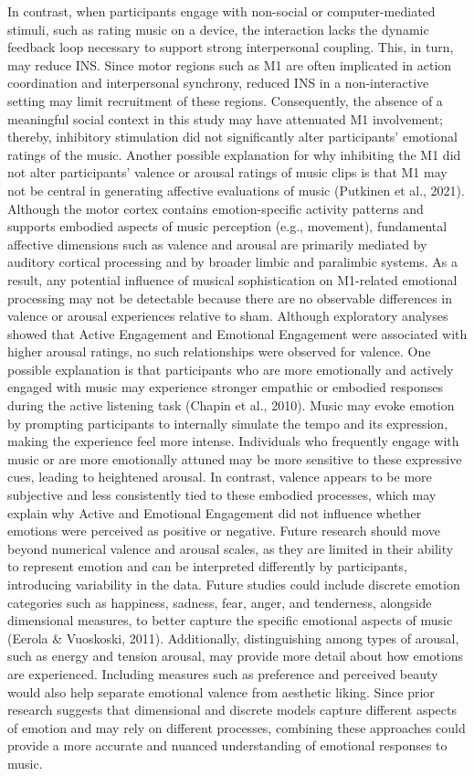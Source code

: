 \documentclass[
]{article}
\begin{document}
In contrast, when participants engage with non-social or
computer-mediated stimuli, such as rating music on a device, the
interaction lacks the dynamic feedback loop necessary to support strong
interpersonal coupling. This, in turn, may reduce INS. Since motor
regions such as M1 are often implicated in action coordination and
interpersonal synchrony, reduced INS in a non-interactive setting may
limit recruitment of these regions. Consequently, the absence of a
meaningful social context in this study may have attenuated M1
involvement; thereby, inhibitory stimulation did not significantly alter
participants' emotional ratings of the music. Another possible
explanation for why inhibiting the M1 did not alter participants'
valence or arousal ratings of music clips is that M1 may not be central
in generating affective evaluations of music (Putkinen et al., 2021).
Although the motor cortex contains emotion-specific activity patterns
and supports embodied aspects of music perception (e.g., movement),
fundamental affective dimensions such as valence and arousal are
primarily mediated by auditory cortical processing and by broader limbic
and paralimbic systems. As a result, any potential influence of musical
sophistication on M1-related emotional processing may not be detectable
because there are no observable differences in valence or arousal
experiences relative to sham. Although exploratory analyses showed that
Active Engagement and Emotional Engagement were associated with higher
arousal ratings, no such relationships were observed for valence. One
possible explanation is that participants who are more emotionally and
actively engaged with music may experience stronger empathic or embodied
responses during the active listening task (Chapin et al., 2010). Music
may evoke emotion by prompting participants to internally simulate the
tempo and its expression, making the experience feel more intense.
Individuals who frequently engage with music or are more emotionally
attuned may be more sensitive to these expressive cues, leading to
heightened arousal. In contrast, valence appears to be more subjective
and less consistently tied to these embodied processes, which may
explain why Active and Emotional Engagement did not influence whether
emotions were perceived as positive or negative. Future research should
move beyond numerical valence and arousal scales, as they are limited in
their ability to represent emotion and can be interpreted differently by
participants, introducing variability in the data. Future studies could
include discrete emotion categories such as happiness, sadness, fear,
anger, and tenderness, alongside dimensional measures, to better capture
the specific emotional aspects of music (Eerola \& Vuoskoski, 2011).
Additionally, distinguishing among types of arousal, such as energy and
tension arousal, may provide more detail about how emotions are
experienced. Including measures such as preference and perceived beauty
would also help separate emotional valence from aesthetic liking. Since
prior research suggests that dimensional and discrete models capture
different aspects of emotion and may rely on different processes,
combining these approaches could provide a more accurate and nuanced
understanding of emotional responses to music.
\end{document}
